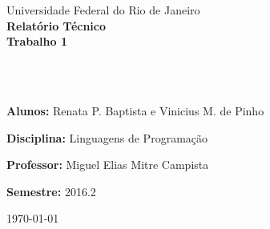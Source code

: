 \documentclass[12pt,a4paper]{article}
\author{Renata Porciuncula e Vinicius Mesquita}
\begin{document}
	
	

	\thispagestyle{plain}
	
	\noindent
	\begin{center}
		{\Large Universidade Federal do Rio de Janeiro \\
			\noindent
			{\Large\textbf{Relatório Técnico}}\\
			{\LARGE\textbf{Trabalho 1}}\\
			\hspace{15cm}
			\hfill \parbox{16cm}{\ ~\\ ~\\}
			\hfill \parbox{16cm}{\textbf{Alunos:} Renata P. Baptista e Vinicius M. de Pinho\\}
			\hfill \parbox{16cm}{\textbf{Disciplina:} Linguagens de Programação\\}
			\hfill \parbox{16cm}{\textbf{Professor:} Miguel Elias Mitre Campista\\}
			\hfill \parbox{16cm}{\textbf{Semestre:}  2016.2\\}
			
		}\end{center}
		
		
		\begin{center}
			\today\\
		\end{center}
		
\end{document}
